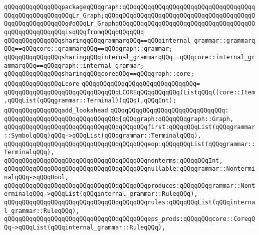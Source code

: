 \verb|qQQqqQQqqQQqqQQqpackageqQQqgraph:qQQqqQQqqQQqqQQqqQQqqQQqqQQqqQQqqQQqqQQqqQQqqQQqqQQqqQQqLr_Graph;qQQqqQQqqQQqqQQqqQQqqQQqqQQqqQQqqQQqqQQqqQQqqQQqqQQqqQQqqQQq#qQQqLr_GraphqQQqqQQqqQQqqQQqqQQqqQQqqQQqqQQqqQQqqQQqqQQqqQQqqQQqqQQqisqQQqfromqQQqqQQqqQQq|\newline
\newline
\verb|qQQqqQQqqQQqqQQqsharingqQQqgrammarqQQq==qQQqinternal_grammar::grammarqQQq==qQQqcore::grammarqQQq==qQQqgraph::grammar;|\newline
\verb|qQQqqQQqqQQqqQQqsharingqQQqinternal_grammarqQQq==qQQqcore::internal_grammarqQQq==qQQqgraph::internal_grammar;|\newline
\verb|qQQqqQQqqQQqqQQqsharingqQQqcoreqQQq==qQQqgraph::core;|\newline
\newline
\verb|qQQqqQQqqQQqqQQqLcore|\newline
\verb|qQQqqQQqqQQqqQQqqQQqqQQqqQQqqQQq=|\newline
\verb|qQQqqQQqqQQqqQQqqQQqqQQqqQQqqQQqLCOREqQQqqQQqqQQq(ListqQQq((core::Item,qQQqList(qQQqgrammar::Terminal))qQQq),qQQqInt);|\newline
\newline
\verb|qQQqqQQqqQQqqQQqadd_lookahead|\newline
\verb|qQQqqQQqqQQqqQQqqQQqqQQqqQQqqQQq:|\newline
\verb|qQQqqQQqqQQqqQQqqQQqqQQqqQQqqQQq{qQQqgraph:qQQqqQQqgraph::Graph,|\newline
\verb|qQQqqQQqqQQqqQQqqQQqqQQqqQQqqQQqqQQqqQQqfirst:qQQqqQQqList(qQQqgrammar::SymbolqQQq)qQQq->qQQqList(qQQqgrammar::TerminalqQQq),|\newline
\verb|qQQqqQQqqQQqqQQqqQQqqQQqqQQqqQQqqQQqqQQqeop:qQQqqQQqList(qQQqgrammar::TerminalqQQq),|\newline
\verb|qQQqqQQqqQQqqQQqqQQqqQQqqQQqqQQqqQQqqQQqnonterms:qQQqqQQqInt,|\newline
\verb|qQQqqQQqqQQqqQQqqQQqqQQqqQQqqQQqqQQqqQQqnullable:qQQqgrammar::NonterminalqQQq->qQQqBool,|\newline
\verb|qQQqqQQqqQQqqQQqqQQqqQQqqQQqqQQqqQQqqQQqproduces:qQQqqQQqgrammar::NonterminalqQQq->qQQqList(qQQqinternal_grammar::RuleqQQq),|\newline
\verb|qQQqqQQqqQQqqQQqqQQqqQQqqQQqqQQqqQQqqQQqrules:qQQqqQQqList(qQQqinternal_grammar::RuleqQQq),|\newline
\verb|qQQqqQQqqQQqqQQqqQQqqQQqqQQqqQQqqQQqqQQqeps_prods:qQQqqQQqcore::CoreqQQq->qQQqList(qQQqinternal_grammar::RuleqQQq),|\newline
